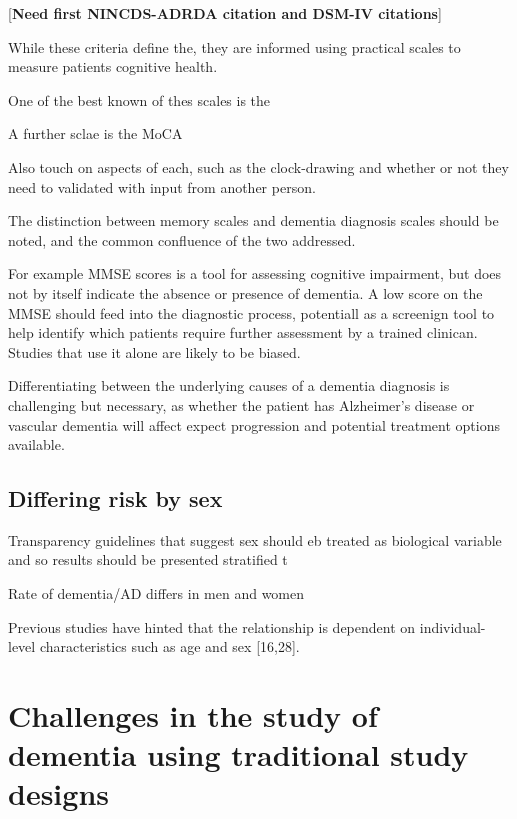 \documentclass[a4paper,nobind]{templates/ociamthesis}
\begin{document}
{[}\textbf{Need first NINCDS-ADRDA citation and DSM-IV citations}{]}

While these criteria define the, they are informed using practical scales to measure patients cognitive health.

One of the best known of thes scales is the

A further sclae is the MoCA

Also touch on aspects of each, such as the clock-drawing and whether or not they need to validated with input from another person.

The distinction between memory scales and dementia diagnosis scales should be noted, and the common confluence of the two addressed.

For example MMSE scores is a tool for assessing cognitive impairment, but does not by itself indicate the absence or presence of dementia. A low score on the MMSE should feed into the diagnostic process, potentiall as a screenign tool to help identify which patients require further assessment by a trained clinican. Studies that use it alone are likely to be biased.

Differentiating between the underlying causes of a dementia diagnosis is challenging but necessary, as whether the patient has Alzheimer's disease or vascular dementia will affect expect progression and potential treatment options available.

\hypertarget{differing-risk-by-sex}{%
\subsection{Differing risk by sex}\label{differing-risk-by-sex}}

Transparency guidelines that suggest sex should eb treated as biological variable and so results should be presented stratified t

Rate of dementia/AD differs in men and women

Previous studies have hinted that the relationship is dependent on individual-level characteristics such as age and sex {[}16,28{]}.

\hypertarget{challenges-in-the-study-of-dementia-using-traditional-study-designs}{%
\section{Challenges in the study of dementia using traditional study designs}\label{challenges-in-the-study-of-dementia-using-traditional-study-designs}}
\end{document}

